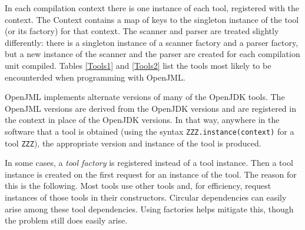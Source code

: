In each compilation context there is one instance of each tool, registered with the context. The Context contains a map
of keys to the singleton instance of the tool (or its factory) for that context. The scanner and parser are treated slightly differently: there is a singleton instance of a scanner factory and a parser factory, but a new instance of the
scanner and the parser are created for each compilation unit compiled. Tables \ref{Tools1} and \ref{Tools2} list the tools
most likely to be encounterded when programming with OpenJML.

OpenJML implements
alternate versions of many of the OpenJDK tools. The OpenJML versions are derived from the OpenJDK versions and are 
registered in the context in place of the OpenJDK versions. In that way, anywhere in the software that a tool is
obtained (using the syntax {\tt ZZZ.instance(context)} for a tool {\tt ZZZ}), the appropriate version and instance
of the tool
is produced.

In some cases, a {\em tool factory} is registered instead of a tool instance. Then a tool instance is created on the
first request for an instance of the tool. The reason for this is the following. Most tools use other tools and, for
efficiency, request instances of those tools in their constructors. Circular dependencies can easily arise among these
tool dependencies. Using factories helps mitigate this, though the problem still does easily arise.



